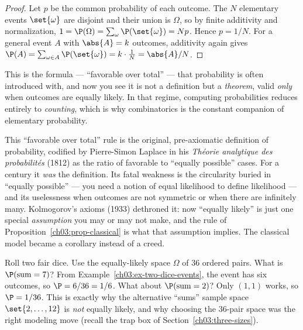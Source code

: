 \begin{proof}
Let $p$ be the common probability of each outcome. The $N$ elementary events
$\set{\omega}$ are disjoint and their union is $\Omega$, so by finite additivity
and normalization, $1 = \P(\Omega) = \sum_{\omega} \P(\set{\omega}) = Np$. Hence
$p = 1/N$. For a general event $A$ with $\abs{A} = k$ outcomes, additivity again
gives $\P(A) = \sum_{\omega \in A} \P(\set{\omega}) = k \cdot \frac{1}{N} =
\abs{A}/N$.
\end{proof}

This is the formula --- ``favorable over total'' --- that probability is often
introduced with, and now you see it is not a definition but a \emph{theorem},
valid \emph{only} when outcomes are equally likely. In that regime, computing
probabilities reduces entirely to \emph{counting}, which is why combinatorics is
the constant companion of elementary probability.

\begin{historybox}
This ``favorable over total'' rule is the original, pre-axiomatic definition of
probability, codified by Pierre-Simon Laplace in his \emph{Th\'eorie analytique
des probabilit\'es} (1812) as the ratio of favorable to ``equally possible''
cases. For a century it \emph{was} the definition. Its fatal weakness is the
circularity buried in ``equally possible'' --- you need a notion of equal
likelihood to define likelihood --- and its uselessness when outcomes are not
symmetric or when there are infinitely many. Kolmogorov's axioms (1933) dethroned
it: now ``equally likely'' is just one special \emph{assumption} you may or may
not make, and the rule of Proposition~\ref{ch03:prop-classical} is what that
assumption implies. The classical model became a corollary instead of a creed.
\end{historybox}

\begin{example}
\label{ch03:ex-dice-sum}
Roll two fair dice. Use the equally-likely space $\Omega$ of $36$ ordered pairs.
What is $\P(\text{sum} = 7)$? From Example~\ref{ch03:ex-two-dice-events}, the event
has six outcomes, so $\P = 6/36 = 1/6$. What about $\P(\text{sum} = 2)$? Only
$(1,1)$ works, so $\P = 1/36$. This is exactly why the alternative ``sums''
sample space $\set{2,\dots,12}$ is \emph{not} equally likely, and why choosing the
$36$-pair space was the right modeling move (recall the trap box of
Section~\ref{ch03:three-sizes}).
\end{example}

